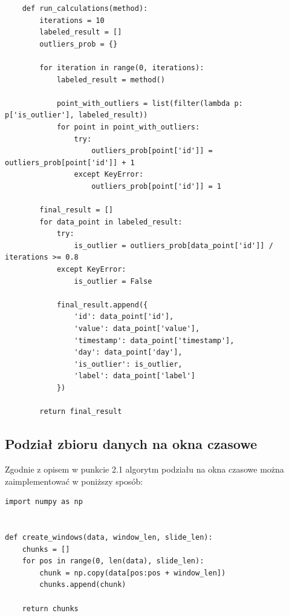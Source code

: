 \documentclass[eng,printmode]{mgr}
\begin{document}
\begin{lstlisting}
    def run_calculations(method):
        iterations = 10
        labeled_result = []
        outliers_prob = {}

        for iteration in range(0, iterations):
            labeled_result = method()

            point_with_outliers = list(filter(lambda p: p['is_outlier'], labeled_result))
            for point in point_with_outliers:
                try:
                    outliers_prob[point['id']] = outliers_prob[point['id']] + 1
                except KeyError:
                    outliers_prob[point['id']] = 1

        final_result = []
        for data_point in labeled_result:
            try:
                is_outlier = outliers_prob[data_point['id']] / iterations >= 0.8
            except KeyError:
                is_outlier = False

            final_result.append({
                'id': data_point['id'],
                'value': data_point['value'],
                'timestamp': data_point['timestamp'],
                'day': data_point['day'],
                'is_outlier': is_outlier,
                'label': data_point['label']
            })

        return final_result
\end{lstlisting}


\subsection{Podział zbioru danych na okna czasowe}
Zgodnie z opisem w punkcie 2.1 algorytm podziału na okna czasowe można zaimplementować w poniższy sposób:
\\
\begin{lstlisting}
import numpy as np


def create_windows(data, window_len, slide_len):
    chunks = []
    for pos in range(0, len(data), slide_len):
        chunk = np.copy(data[pos:pos + window_len])
        chunks.append(chunk)

    return chunks
\end{lstlisting}
\end{document}

